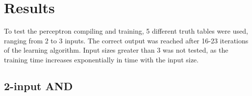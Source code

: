 
\section{Results}
To test the perceptron compiling and training, 5 different truth tables were used, ranging from 2 to 3 inputs. The correct output was reached after 16-23 iterations of the learning algorithm. Input sizes greater than 3 was not tested, as the training time increases exponentially in time with the input size.

\subsection{2-input AND}

\begin{figure}[H]
  \begin{subfigure}[t]{.49\columnwidth}


\end{subfigure}
\end{figure}
